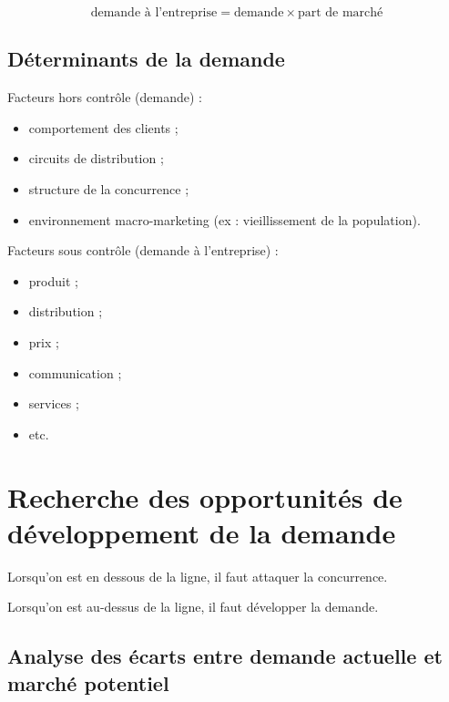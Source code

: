 		$$\text{demande à l'entreprise} = \text{demande} \times  \text{part de marché}$$
		
		
		\subsection{Déterminants de la demande}
		
		Facteurs hors contrôle (demande) :
		
		\begin{itemize}
			\item comportement des clients ;
			\item circuits de distribution ;
			\item structure de la concurrence ;
			\item environnement macro-marketing (ex : vieillissement de la population).
		\end{itemize}
		\n
		Facteurs sous contrôle (demande à l'entreprise) :
		
		\begin{itemize}
			\item produit ;
			\item distribution ;
			\item prix ;
			\item communication ;
			\item services ;
			\item etc.
		\end{itemize}
		
	\section{Recherche des opportunités de développement de la demande}
	
		
		Lorsqu'on est en dessous de la ligne, il faut attaquer la concurrence.
		
		Lorsqu'on est au-dessus de la ligne, il faut développer la demande.
		
		\subsection{Analyse des écarts entre demande actuelle et marché potentiel}
		
